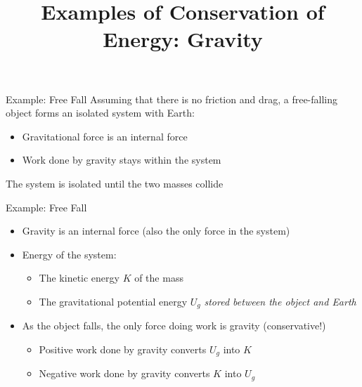 \documentclass[12pt,compress,aspectratio=169]{beamer}
\title{Examples of Conservation of Energy: Gravity}
\date{}
\begin{document}
\begin{frame}
  \maketitle
\end{frame}



\begin{frame}{Example: Free Fall}{}  
  {\color{orange}Assuming that there is no friction and drag}, a free-falling
  object forms an isolated system with Earth:
  \begin{center}
  \end{center}
  \begin{itemize}
  \item Gravitational force is an internal force
  \item Work done by gravity stays within the system
  \end{itemize}
  The system is isolated until the two masses collide
\end{frame}



\begin{frame}{Example: Free Fall}
  \begin{center}
  \end{center}
  \begin{itemize}
  \item Gravity is an internal force (also the only force in the system)
  \item Energy of the system:
    \begin{itemize}
    \item The kinetic energy $K$ of the mass
    \item The gravitational potential energy $U_g$ \emph{stored between the
    object and Earth}
    \end{itemize}
  \item As the object falls, the only force doing work is gravity
    (conservative!)
    \begin{itemize}
    \item Positive work done by gravity converts $U_g$ into $K$
    \item Negative work done by gravity converts $K$ into $U_g$
    \end{itemize}
  \end{itemize}
\end{frame}
\end{document}
